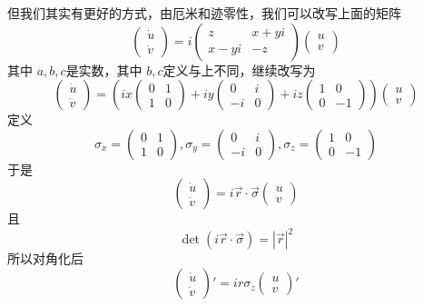 \documentclass[hyperref,UTF8]{ctexart}
\begin{document}
但我们其实有更好的方式，由厄米和迹零性，我们可以改写上面的矩阵
\[\begin{pmatrix}
    \dot{u}\\\dot{v}
\end{pmatrix}=i\begin{pmatrix}
    z& x+yi\\
    x-yi&-z
\end{pmatrix}\begin{pmatrix}
    u\\v
\end{pmatrix}\]
其中 $a,b,c$是实数，其中 $b,c$定义与上不同，继续改写为 
\[\begin{pmatrix}
    \dot{u}\\\dot{v}
\end{pmatrix}=(ix\begin{pmatrix}
    0& 1\\
    1&0
\end{pmatrix}+iy\begin{pmatrix}
    0& i\\
    -i&0
\end{pmatrix}+iz\begin{pmatrix}
    1& 0\\
    0&-1
\end{pmatrix})\begin{pmatrix}
    u\\v
\end{pmatrix}\]
定义
\[\sigma_x=\begin{pmatrix}
    0& 1\\
    1&0
\end{pmatrix},\sigma_y=\begin{pmatrix}
    0& i\\
    -i&0
\end{pmatrix},\sigma_z=\begin{pmatrix}
    1& 0\\
    0&-1
\end{pmatrix}\]
于是
\[\begin{pmatrix}
    \dot{u}\\\dot{v}
\end{pmatrix}=i\vec{r}\cdot\vec{\sigma}\begin{pmatrix}
    u\\v
\end{pmatrix}\]
且
\[\det (i\vec{r}\cdot\vec{\sigma})=|\vec{r}|^2\]
所以对角化后
\[\begin{pmatrix}
    \dot{u}\\\dot{v}
\end{pmatrix}'=ir\sigma_z\begin{pmatrix}
    u\\v
\end{pmatrix}'\]
\end{document}
